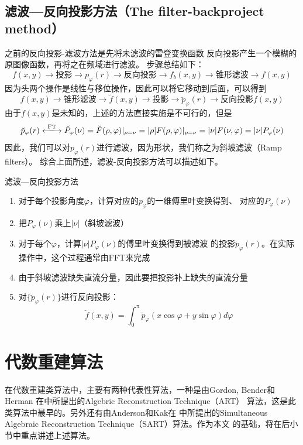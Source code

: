 \subsection{滤波—反向投影方法（The filter-backproject method）}
之前的反向投影-滤波方法是先将未滤波的雷登变换函数
反向投影产生一个模糊的原图像函数，再将之在频域进行滤波。
步骤总结如下：
\begin{equation*}
f(x,y)\rightarrow\boxed{\text{投影}}
\rightarrow p_\varphi(r)\rightarrow\boxed{\text{反向投影}}
\rightarrow f_b(x,y)\rightarrow\boxed{\text{锥形滤波}}\rightarrow
f(x,y)
\end{equation*}
因为头两个操作是线性与移位操作，因此可以将它移动到后面，可以得到
\begin{equation*}
f(x,y)\rightarrow\boxed{\text{锥形滤波}}\rightarrow
\breve{f}(x,y)\rightarrow\boxed{\text{投影}}
\rightarrow \breve{p}_\varphi(r)\rightarrow\boxed{\text{反向投影}}
f(x,y)
\end{equation*}
由于$f(x,y)$是未知的，上述的方法直接实施是不可行的，但是
\begin{equation*}
\breve{p}_\varphi(r)\xlongleftrightarrow{\text{FT}}{}
\breve{P}_\varphi(\nu)=\breve{F}(\rho,\varphi)\arrowvert_{\rho=\nu}
=|\rho|F(\rho,\varphi)\arrowvert_{\rho=\nu}=|\nu|F(\nu,\varphi)=|\nu|P_\varphi(\nu)
\end{equation*}
因此，我们可以对$p_\varphi(r)$进行滤波，因为形状，我们称之为斜坡滤波（Ramp filters）。
综合上面所述，滤波-反向投影方法可以描述如下。
\begin{algo}
滤波—反向投影方法
\begin{enumerate}
\item{对于每个投影角度$\varphi$，计算对应的$p_\varphi$的一维傅里叶变换得到、
对应的$P_\varphi(\nu)$}
\item{把$P_\varphi(\nu)$乘上$|\nu|$（斜坡滤波）}
\item{对于每个$\varphi$，计算$|\nu|P_\varphi(\nu)$的傅里叶变换得到被滤波
的投影$\breve{p}_\varphi(r)$。在实际操作中，这个过程通常由FFT来完成}
\item{由于斜坡滤波缺失直流分量，因此要把投影补上缺失的直流分量}
\item{对$\{\breve{p}_\varphi(r)\}$进行反向投影：
\begin{equation*}
\breve{f}(x,y)=\int^\pi_0\breve{p}_\varphi(x\cos\varphi+y\sin\varphi)d\varphi
\end{equation*}}
\end{enumerate}
\end{algo}
\section{代数重建算法}
在代数重建类算法中，主要有两种代表性算法，一种是由Gordon, Bender和Herman
在\cite{gordon1970algebraic}中所提出的Algebric Reconstruction Technique（ART）
算法，这是此类算法中最早的。另外还有由Anderson和Kak在\cite{andersen1984simultaneous}
中所提出的Simultaneous Algebraic Reconstruction Technique（SART）算法。作为本文
的基础，将在后小节中重点讲述上述算法。

